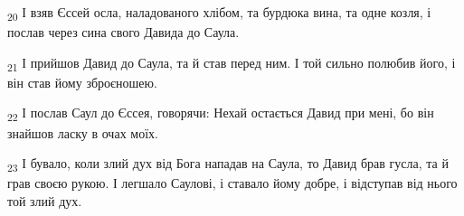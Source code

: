\begin{tcolorbox}
\textsubscript{20} І взяв Єссей осла, наладованого хлібом, та бурдюка вина, та одне козля, і послав через сина свого Давида до Саула.
\end{tcolorbox}
\begin{tcolorbox}
\textsubscript{21} І прийшов Давид до Саула, та й став перед ним. І той сильно полюбив його, і він став йому зброєношею.
\end{tcolorbox}
\begin{tcolorbox}
\textsubscript{22} І послав Саул до Єссея, говорячи: Нехай остається Давид при мені, бо він знайшов ласку в очах моїх.
\end{tcolorbox}
\begin{tcolorbox}
\textsubscript{23} І бувало, коли злий дух від Бога нападав на Саула, то Давид брав гусла, та й грав своєю рукою. І легшало Саулові, і ставало йому добре, і відступав від нього той злий дух.
\end{tcolorbox}
